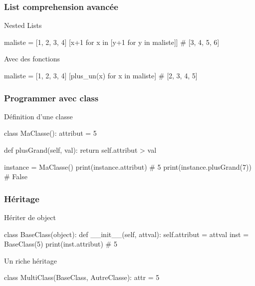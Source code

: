 \documentclass{beamer}
\begin{document}
\begin{frame}[fragile]
  \frametitle{List comprehension avancée}

  \begin{block}{Nested Lists}
    \begin{python}
maliste = [1, 2, 3, 4]
[x+1 for x in [y+1 for y in maliste]] 
# [3, 4, 5, 6]
    \end{python}
  \end{block}

  \begin{block}{Avec des fonctions}
    \begin{python}
maliste = [1, 2, 3, 4]
[plus_un(x) for x in maliste] # [2, 3, 4, 5]
    \end{python}
  \end{block}

\end{frame}

\begin{frame}[fragile]
  \frametitle{Programmer avec class}

  \begin{block}{Définition d'une classe}
    \begin{python}
class MaClasse():
  attribut = 5

  def plusGrand(self, val):
    return self.attribut > val

instance = MaClasse()
print(instance.attribut) # 5
print(instance.plusGrand(7)) # False
    \end{python}
  \end{block}
\end{frame}


\begin{frame}[fragile]
  \frametitle{Héritage}

  \begin{block}{Hériter de object}
    \begin{python}
class BaseClass(object):
  def __init__(self, attval):
    self.attribut = attval
inst = BaseClass(5)
print(inst.attribut) # 5
    \end{python}

  \end{block}

  \begin{block}{Un riche héritage}
  \begin{python}
class MultiClass(BaseClass, AutreClasse):
  attr = 5
  \end{python}
    
  \end{block}
\end{frame}
\end{document}

